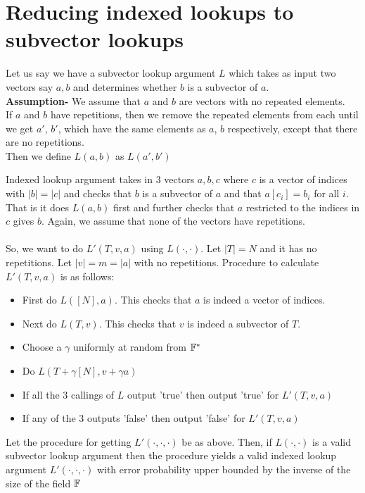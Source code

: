 \section{Reducing indexed lookups to subvector lookups}
Let us say we have a subvector lookup argument $L$ which takes as input two vectors say $a, b$ and determines whether $b$ is a subvector of $a$.\\
\textbf{Assumption-} We assume that $a$ and $b$ are vectors with no repeated elements.\\
If $a$ and $b$ have repetitions, then we remove the repeated elements from each until we get $a'$, $b'$, which have the same elements as $a$, $b$ respectively, except that there are no repetitions.\\
Then we define $L(a,b)$ as $L(a', b')$


Indexed lookup argument takes in 3 vectors $a, b, c$ where $c$ is a vector of indices with $|b|=|c|$ and checks that $b$ is a subvector of $a$ and that $a[c_i]=b_i$ for all $i$. That is it does $L(a, b)$ first and further checks that $a$ restricted to the indices in $c$ gives $b$. Again, we assume that none of the vectors have repetitions.\\\\
So, we want to do $L'(T, v, a)$ using $L(\cdot, \cdot)$.
Let $|T|=N$ and it has no repetitions. Let $|v|=m=|a|$ with no repetitions.
Procedure to calculate $L'(T, v, a)$ is as follows:
\begin{itemize}
    \item First do $L([N], a)$. This checks that $a$ is indeed a vector of indices.
    \item Next do $L(T, v)$. This checks that $v$ is indeed a subvector of $T$.
    \item Choose a $\gamma$ uniformly at random from $\mathbb{F}^*$
    \item Do $L(T+\gamma[N], v+\gamma a)$
    \item If all the 3 callings of $L$ output 'true' then output 'true' for $L'(T, v, a)$
    \item If any of the 3 outputs 'false' then output 'false' for $L'(T, v, a)$
\end{itemize}

\begin{lemma}\label{lem:reduction}
    Let the procedure for getting $L'(\cdot, \cdot, \cdot)$ be as above. Then, if $L(\cdot, \cdot)$ is a valid subvector lookup argument then the procedure yields a valid indexed lookup argument $L'(\cdot, \cdot, \cdot)$ with error probability upper bounded by the inverse of the size of the field $\mathbb{F}$
\end{lemma}

